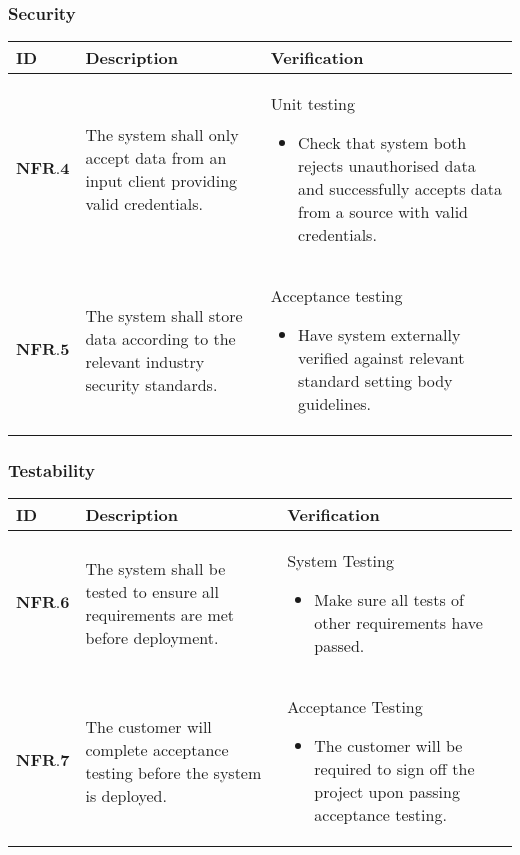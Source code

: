 \subsubsection{Security}
\begin{longtable}[H]{|p{1.5cm}|p{4.5cm}|p{10.5cm}|}
    \hline
    \cellcolor{titleColor}\textbf{ID} & \cellcolor{titleColor}\textbf{Description} & \cellcolor{titleColor}\textbf{Verification} \\ \hline
    $ \textbf{NFR.4} $ & The system shall only accept data from an input client providing valid credentials. & Unit testing\begin{itemize}\item Check that system both rejects unauthorised data and successfully accepts data from a source with valid credentials.\end{itemize} \\ \hline
    $ \textbf{NFR.5} $ & The system shall store data according to the relevant industry security standards. & Acceptance testing\begin{itemize}\item Have system externally verified against relevant standard setting body guidelines.\end{itemize} \\ \hline
\end{longtable}

\subsubsection{Testability}
\begin{longtable}[H]{|p{1.5cm}|p{4.5cm}|p{10.5cm}|}
    \hline
    \cellcolor{titleColor}\textbf{ID} & \cellcolor{titleColor}\textbf{Description} & \cellcolor{titleColor}\textbf{Verification} \\ \hline
    $ \textbf{NFR.6} $ & The system shall be tested to ensure all requirements are met before deployment. & System Testing\begin{itemize}\item Make sure all tests of other requirements have passed.\end{itemize} \\ \hline
   $  \textbf{NFR.7} $ & The customer will complete acceptance testing before the system is deployed. & Acceptance Testing\begin{itemize}\item The customer will be required to sign off the project upon passing acceptance testing.\end{itemize} \\ \hline
\end{longtable}

